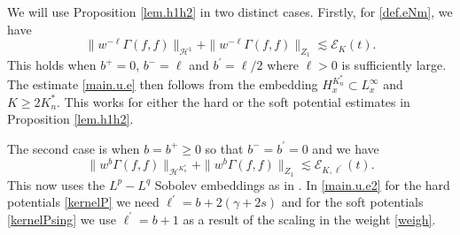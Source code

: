 \documentclass{amsart}
\numberwithin{equation}{section}
\begin{document}
We will use Proposition \ref{lem.h1h2} in two distinct cases. 
Firstly, for \eqref{def.eNm}, we have
\begin{equation}
 \| w^{-\ell}\Gamma(f,f) \|_{{\mathcal{H}}^1}
 +
 \| w^{-\ell}\Gamma(f,f) \|_{ Z_1}
 \lesssim
{\mathcal{E}}_{K}(t).
\label{main.u.e}
\end{equation}
This holds when ${b}^+=0$,  ${b}^- = \ell$ and ${b}^\prime = \ell /2$ where $\ell>0$ is sufficiently large.  The estimate \eqref{main.u.e} then follows from the embedding $H^{K^*_n}_x \subset L^\infty_x$ and ${{K \ge 2{K^*_n}}}$.
This works for either the hard or the soft potential estimates in Proposition \ref{lem.h1h2}. 

The second case is when ${b}={b}^+\ge 0$ so that ${b}^- = {b}^\prime=0$ and we have 
\begin{equation}
 \| w^{b}\Gamma(f,f) \|_{{\mathcal{H}}^{K^*_n}}+
  \| w^{b}\Gamma(f,f) \|_{ Z_1}
 \lesssim
{\mathcal{E}}_{{K},{\ell}^\prime}(t).  
\label{main.u.e2}
\end{equation}
This now uses the $L^p-L^q$ Sobolev embeddings as in \cite[Remark of (6.9)]{gsNonCut0}.   
In \eqref{main.u.e2} for the hard potentials \eqref{kernelP} we need ${\ell}^\prime = b+2(\gamma+2s)$ and for the soft potentials \eqref{kernelPsing} we use ${\ell}^\prime = b+1$ as a result of the scaling in the weight \eqref{weigh}.  
\end{document}
